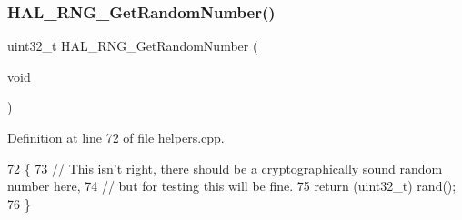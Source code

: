 \subsubsection{H\+A\+L\+\_\+\+R\+N\+G\+\_\+\+Get\+Random\+Number()}
{\footnotesize\ttfamily uint32\+\_\+t H\+A\+L\+\_\+\+R\+N\+G\+\_\+\+Get\+Random\+Number (\begin{DoxyParamCaption}\item[{void}]{ }\end{DoxyParamCaption})}



Definition at line 72 of file helpers.\+cpp.


\begin{DoxyCode}
72                                        \{
73     \textcolor{comment}{// This isn't right, there should be a cryptographically sound random number here,}
74     \textcolor{comment}{// but for testing this will be fine.}
75     \textcolor{keywordflow}{return} (uint32\_t) rand();
76 \}
\end{DoxyCode}
